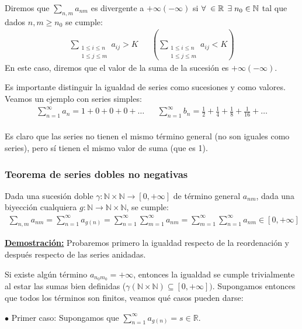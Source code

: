 \documentclass[12pt,a4paper]{article}
\newcommand{\R}{\mathbb{R}}
\newcommand{\N}{\mathbb{N}}
\newcounter{unit}[section]
\newcounter{chapter}[unit]
\renewcommand{\theunit}{\arabic{unit}}
\renewcommand{\thechapter}{\arabic{chapter}}
\renewcommand{\thesubsubsection}{\theunit.\thechapter.\arabic{subsubsection}}
\newcommand{\result}[1]{%
  \subsubsection{#1}%
  \label{result:\thesubsubsection}
}
\newcommand{\dem}{
    \noindent \underline{\textbf{Demostración:}}
}
\begin{document}
\vspace{4mm}
Diremos que $\sum_{n,m} a_{nm}$ es divergente a $+\infty (-\infty)$ si $\forall \hspace{1mm} \in \R$
$\exists \hspace{1mm} n_0  \in \N$ tal que dados $n, m \geq n_0$ se cumple: \\[-5ex]
\begin{align*}
    \sum_{\substack{1\leq i \leq n\\1 \leq j \leq m}}a_{ij} > K &&
    \left(\sum_{\substack{1\leq i \leq n\\1 \leq j \leq m}}a_{ij} < K\right)
\end{align*}
En este caso, diremos que el valor de la suma de la sucesión es $+\infty (-\infty)$.

Es importante distinguir la igualdad de series como sucesiones y como valores. Veamos un ejemplo
con series simples: \\[-5ex]
\begin{align*}
    \sum_{n=1}^\infty a_n = 1 +0+0+0+\ldots &&
    \sum_{n=1}^\infty b_n = \frac{1}{2} + \frac{1}{4} + \frac{1}{8} + \frac{1}{16} + \ldots
\end{align*} \\[-4ex]
Es claro que las series no tienen el mismo término general (no son iguales como series), pero sí tienen el mismo valor de suma (que es 1).

\vspace{6mm}
\result{Teorema de series dobles no negativas}
\hspace{3mm} Dada una sucesión doble $\gamma : \N \times \N \longrightarrow [0, +\infty]$ de término general $a_{nm}$,
dada una biyección cualquiera $g : \N \longrightarrow \N \times \N$, se cumple:
\begin{align*}
    \sum_{n,m} a_{nm} = \sum_{n = 1}^{\infty}a_{g(n)} = \sum_{n=1}^{\infty}\sum_{m=1}^{\infty}a_{nm} = \sum_{m=1}^{\infty}\sum_{n=1}^{\infty}a_{nm} \in[0, +\infty]
\end{align*}
\dem Probaremos primero la igualdad respecto de la reordenación y después respecto de las series anidadas.

\vspace{2mm}
Si existe algún término $a_{n_0m_0} = +\infty$, entonces la igualdad se cumple trivialmente al estar las sumas bien definidas ($\gamma(\N \times \N) \subseteq[0, +\infty])$.
Supongamos entonces que todos los términos son finitos, veamos qué casos pueden darse:

\vspace{5mm}
$\bullet$ Primer caso: Supongamos que $\displaystyle{\sum_{n=1}^{\infty}a_{g(n)}} = s \in \R$.
\end{document}
